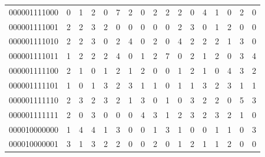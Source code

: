 \documentclass[10pt,a4paper]{article}
\begin{document}
\begin{longtable}{ |c|c|c|c|c|c|c|c|c|c|c|c|c|c|c|c|c| }
    000001111000              & 0                            & 1                                & 2                            & 0                              & 7   & 2   & 0   & 2   & 2   & 2   & 0   & 4   & 1   & 0   & 2   & 0   \\
    000001111001              & 2                            & 2                                & 3                            & 2                              & 0   & 0   & 0   & 0   & 0   & 2   & 3   & 0   & 1   & 2   & 0   & 0   \\
    000001111010              & 2                            & 2                                & 3                            & 0                              & 2   & 4   & 0   & 2   & 0   & 4   & 2   & 2   & 2   & 1   & 3   & 0   \\
    000001111011              & 1                            & 2                                & 2                            & 2                              & 4   & 0   & 1   & 2   & 7   & 0   & 2   & 1   & 2   & 0   & 3   & 4   \\
    000001111100              & 2                            & 1                                & 0                            & 1                              & 2   & 1   & 2   & 0   & 0   & 1   & 2   & 1   & 0   & 4   & 3   & 2   \\
    000001111101              & 1                            & 0                                & 1                            & 3                              & 2   & 3   & 1   & 1   & 0   & 1   & 1   & 3   & 2   & 3   & 1   & 1   \\
    000001111110              & 2                            & 3                                & 2                            & 3                              & 2   & 1   & 3   & 0   & 1   & 0   & 3   & 2   & 2   & 0   & 5   & 3   \\
    000001111111              & 2                            & 0                                & 3                            & 0                              & 0   & 0   & 4   & 3   & 1   & 2   & 3   & 2   & 3   & 2   & 1   & 0   \\
    000010000000              & 1                            & 4                                & 4                            & 1                              & 3   & 0   & 0   & 1   & 3   & 1   & 0   & 0   & 1   & 1   & 0   & 3   \\
    000010000001              & 3                            & 1                                & 3                            & 2                              & 2   & 0   & 0   & 2   & 0   & 1   & 2   & 1   & 1   & 2   & 0   & 0   \\

\end{longtable}
\end{document}
